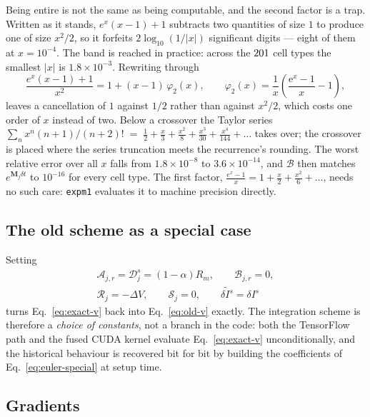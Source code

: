 \documentclass[11pt,a4paper,numbers=noenddot]{scrartcl}
\newcommand{\dt}{\delta t}
\newcommand{\amem}{\alpha}
\newcommand{\Acoef}{\mathcal{A}}
\newcommand{\Bcoef}{\mathcal{B}}
\newcommand{\Dcoef}{\mathcal{D}}
\newcommand{\Rcoef}{\mathcal{R}}
\newcommand{\Scoef}{\mathcal{S}}
\newcommand{\code}[1]{\texttt{\small #1}}
\begin{document}
Being entire is not the same as being computable, and the second factor is a
trap. Written as it stands, $e^{x}(x-1)+1$ subtracts two quantities of size
$1$ to produce one of size $x^{2}/2$, so it forfeits $2\log_{10}(1/|x|)$
significant digits --- eight of them at $x = 10^{-4}$. The band is reached in
practice: across the $201$ cell types the smallest $|x|$ is
$1.8\times10^{-3}$. Rewriting through
%
\begin{equation}
\label{eq:phi2}
\frac{e^{x}(x-1)+1}{x^{2}} = 1 + (x-1)\,\varphi_2(x),
\qquad
\varphi_2(x) = \frac{1}{x}\left(\frac{\mathrm{e}^{x}-1}{x} - 1\right),
\end{equation}
%
leaves a cancellation of $1$ against $1/2$ rather than against $x^{2}/2$, which
costs one order of $x$ instead of two. Below a crossover the Taylor series
$\sum_n x^{n}(n+1)/(n+2)!\;=\;\tfrac12 + \tfrac{x}{3} + \tfrac{x^{2}}{8}
+ \tfrac{x^{3}}{30} + \tfrac{x^{4}}{144} + \dots$ takes over; the crossover is
placed where the series truncation meets the recurrence's rounding. The worst
relative error over all $x$ falls from $1.8\times10^{-8}$ to
$3.6\times10^{-14}$, and $\Bcoef$ then matches
$e^{\bm{M}_j\dt}$ to $10^{-16}$ for every cell type. The first factor,
$\tfrac{e^x-1}{x} = 1 + \tfrac{x}{2} + \tfrac{x^2}{6} + \dots$, needs no such
care: \code{expm1} evaluates it to machine precision directly.

\subsection{The old scheme as a special case}

Setting
%
\begin{equation}
\label{eq:euler-special}
\begin{gathered}
\Acoef_{j,r} = \Dcoef^{s}_{j} = (1-\amem)R_m,
\qquad
\Bcoef_{j,r} = 0, \\[0.25em]
\Rcoef_j = -\Delta V,
\qquad
\Scoef_j = 0,
\qquad
\widetilde{\delta I^{s}} = \delta I^{s}
\end{gathered}
\end{equation}
%
turns Eq.~\eqref{eq:exact-v} back into Eq.~\eqref{eq:old-v} exactly. The
integration scheme is therefore a \emph{choice of constants}, not a branch in
the code: both the TensorFlow path and the fused CUDA kernel evaluate
Eq.~\eqref{eq:exact-v} unconditionally, and the historical behaviour is
recovered bit for bit by building the coefficients of
Eq.~\eqref{eq:euler-special} at setup time.

\subsection{Gradients}
\label{sec:gradients}
\end{document}
